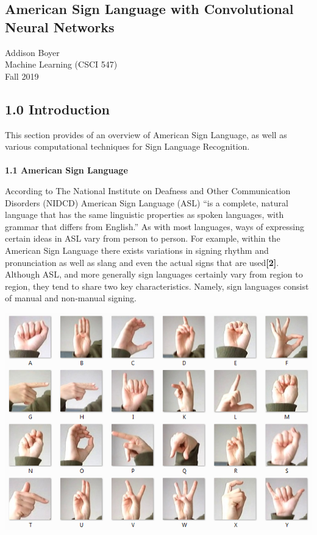 \documentclass[11pt]{article}
\begin{document}
\begin{center}
\section*{American Sign Language with Convolutional Neural Networks}

Addison Boyer \\
Machine Learning (CSCI 547) \\
Fall 2019
\end{center}


\begin{multicols}{2}

\subsection*{1.0 Introduction}
This section provides of an overview of American Sign Language, as well as various computational techniques for Sign Language Recognition.
\\ \\
\textbf{1.1 American Sign Language} 
\par
According to The National Institute on Deafness and Other Communication Disorders (NIDCD) American Sign Language (ASL)
\enquote{is a complete, natural language that has the same linguistic properties as spoken languages, with grammar that differs from English.}  As with most languages, ways of expressing certain ideas in ASL vary from person to person.  For example, within the American Sign Language there exists variations in signing rhythm and pronunciation as well as slang and even the actual signs that are used\textbf{[2]}.  Although ASL, and more generally sign languages certainly vary from region to region, they tend to share two key characteristics.  Namely, sign languages consist of manual and non-manual signing.
\begin{center}
\includegraphics[scale=.45]{amer_sign2}

\end{center}
\end{multicols}
\end{document}
